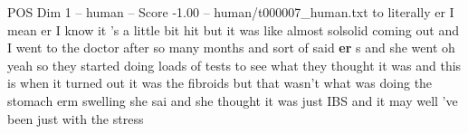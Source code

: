 \begin{textsample}{POS Dim 1 – human – Score -1.00 – human/t000007\_human.txt}  \label{ex:f1_pos_009}
to literally er I mean er I know it 's a little bit hit but it was like almost solsolid coming out and I went to the doctor after so many months and sort of said \textbf{er} s and she went oh yeah so they started doing loads of tests to see what they thought it was and this is when it turned out it was the fibroids but that wasn't what was doing the stomach erm swelling she sai and she thought it was just IBS and it may well 've been just with the stress

\end{textsample}
